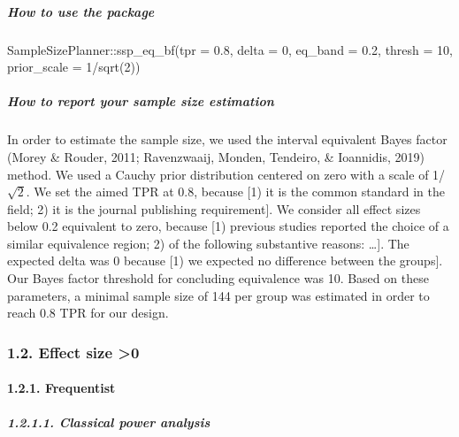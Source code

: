 \documentclass[
  english,
  man,floatsintext]{apa6}
\newenvironment{Shaded}{\begin{snugshade}}{\end{snugshade}}
\newcommand{\AttributeTok}[1]{\textcolor[rgb]{0.77,0.63,0.00}{#1}}
\newcommand{\DecValTok}[1]{\textcolor[rgb]{0.00,0.00,0.81}{#1}}
\newcommand{\FloatTok}[1]{\textcolor[rgb]{0.00,0.00,0.81}{#1}}
\newcommand{\FunctionTok}[1]{\textcolor[rgb]{0.00,0.00,0.00}{#1}}
\newcommand{\NormalTok}[1]{#1}
\newcommand{\SpecialCharTok}[1]{\textcolor[rgb]{0.00,0.00,0.00}{#1}}
\let\oldparagraph\paragraph
\renewcommand{\paragraph}[1]{\oldparagraph{#1}\mbox{}}
\let\oldsubparagraph\subparagraph
\renewcommand{\subparagraph}[1]{\oldsubparagraph{#1}\mbox{}}
\begin{document}
\hypertarget{how-to-use-the-package-1}{%
\subparagraph{How to use the package}\label{how-to-use-the-package-1}}

\begin{Shaded}
\begin{Highlighting}[]
\NormalTok{SampleSizePlanner}\SpecialCharTok{::}\FunctionTok{ssp\_eq\_bf}\NormalTok{(}\AttributeTok{tpr =} \FloatTok{0.8}\NormalTok{, }\AttributeTok{delta =} \DecValTok{0}\NormalTok{, }\AttributeTok{eq\_band =} \FloatTok{0.2}\NormalTok{,}
    \AttributeTok{thresh =} \DecValTok{10}\NormalTok{, }\AttributeTok{prior\_scale =} \DecValTok{1}\SpecialCharTok{/}\FunctionTok{sqrt}\NormalTok{(}\DecValTok{2}\NormalTok{))}
\end{Highlighting}
\end{Shaded}

\hypertarget{how-to-report-your-sample-size-estimation-1}{%
\subparagraph{How to report your sample size estimation}\label{how-to-report-your-sample-size-estimation-1}}

In order to estimate the sample size, we used the interval equivalent Bayes factor (Morey \& Rouder, 2011; Ravenzwaaij, Monden, Tendeiro, \& Ioannidis, 2019) method. We used a Cauchy prior distribution centered on zero with a scale of 1/\(\sqrt{2}\). We set the aimed TPR at 0.8, because {[}1) it is the common standard in the field; 2) it is the journal publishing requirement{]}. We consider all effect sizes below 0.2 equivalent to zero, because {[}1) previous studies reported the choice of a similar equivalence region; 2) of the following substantive reasons: \ldots{]}. The expected delta was 0 because {[}1) we expected no difference between the groups{]}. Our Bayes factor threshold for concluding equivalence was 10. Based on these parameters, a minimal sample size of 144 per group was estimated in order to reach 0.8 TPR for our design.

\hypertarget{effect-size-0-1}{%
\subsubsection{1.2. Effect size \textgreater0}\label{effect-size-0-1}}

\hypertarget{frequentist}{%
\paragraph{1.2.1. Frequentist}\label{frequentist}}

\hypertarget{classical-power-analysis}{%
\subparagraph{1.2.1.1. Classical power analysis}\label{classical-power-analysis}}
\end{document}
